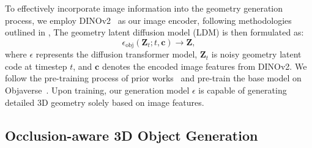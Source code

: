 % 
To effectively incorporate image information into the geometry generation process, we employ DINOv2~\cite{oquab2023dinov2} as our image encoder, following methodologies outlined in \cite{zhang20233dshape2vecset,zhang2024clay, xiang2024structured}, %
The geometry latent diffusion model (LDM) is then formulated as:
\begin{equation}
    \epsilon_\text{obj} (\bm{Z}_t; t,\bm{c}) \rightarrow \bm{Z},
\end{equation}
where $\epsilon$ represents the diffusion transformer model, $\bm{Z}_t$ is noisy geometry latent code at timestep $t$, and $\bm{c}$ denotes the encoded image features from DINOv2. We follow the pre-training process of prior works~\cite{zhang20233dshape2vecset,zhang2024clay} and pre-train the base model on Objaverse~\cite{deitke2023objaverse}. Upon training, our generation model $\epsilon$  is capable of generating detailed 3D geometry solely based on image features.

\subsection{Occlusion-aware 3D Object Generation}
\label{sec:objectgen}


